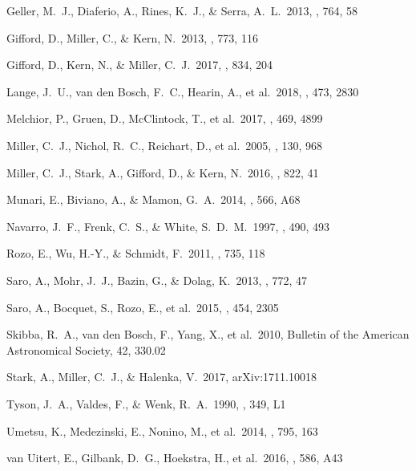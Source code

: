 \documentclass[apj]{emulateapj}
\begin{document}
\begin{thebibliography}{42}
 Geller, M.~J., Diaferio, A., Rines, K.~J., \& Serra, A.~L.\ 2013, \apj, 764, 58 


 Gifford, D., Miller, C., \& Kern, N.\ 2013, \apj, 773, 116 

 Gifford, D., Kern, N., \& Miller, C.~J.\ 2017, \apj, 834, 204 

 Lange, J.~U., van den Bosch, F.~C., Hearin, A., et al.\ 2018, \mnras, 473, 2830 

 Melchior, P., Gruen, D., McClintock, T., et al.\ 2017, \mnras, 469, 4899 

 Miller, C.~J., Nichol, R.~C., Reichart, D., et al.\ 2005, \aj, 130, 968 

 Miller, C.~J., Stark, A., Gifford, D., \& Kern, N.\ 2016, \apj, 822, 41 

 Munari, E., Biviano, A., \& Mamon, G.~A.\ 2014, \aap, 566, A68 

 Navarro, J.~F., Frenk, C.~S., \& White, S.~D.~M.\ 1997, \apj, 490, 493 

 Rozo, E., Wu, H.-Y., \& Schmidt, F.\ 2011, \apj, 735, 118 

 Saro, A., Mohr, J.~J., Bazin, G., \& Dolag, K.\ 2013, \apj, 772, 47 

 Saro, A., Bocquet, S., Rozo, E., et al.\ 2015, \mnras, 454, 2305 

 Skibba, R.~A., van den Bosch, F., Yang, X., et al.\ 2010, Bulletin of the American Astronomical Society, 42, 330.02 

 Stark, A., Miller, C.~J., \& Halenka, V.\ 2017, arXiv:1711.10018 

 Tyson, J.~A., Valdes, F., \& Wenk, R.~A.\ 1990, \apjl, 349, L1 

 Umetsu, K., Medezinski, E., Nonino, M., et al.\ 2014, \apj, 795, 163 


 van Uitert, E., Gilbank, D.~G., Hoekstra, H., et al.\ 2016, \aap, 586, A43 


\end{thebibliography}
\end{document}
